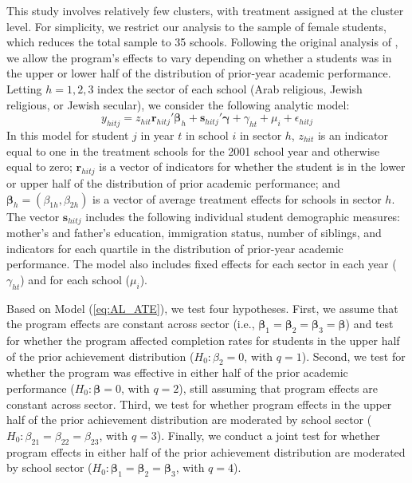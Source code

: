 \documentclass[12pt]{article}\usepackage[]{graphicx}\usepackage[]{color}
\newcommand{\bm}{\mathbf}
\newcommand{\bs}{\boldsymbol}
\begin{document}
This study involves relatively few clusters, with treatment assigned at the cluster level.
For simplicity, we restrict our analysis to the sample of female students, which reduces the total sample to 35 schools.
Following the original analysis of \citet{Angrist2009effects}, we allow the program's effects to vary depending on whether a students was in the upper or lower half of the distribution of prior-year academic performance. 
Letting $h = 1,2,3$ index the sector of each school (Arab religious, Jewish religious, or Jewish secular), we consider the following analytic model: 
\begin{equation}
\label{eq:AL_ATE}
y_{hitj} = z_{hit}\bm{r}_{hitj}'\bs\beta_h + \bm{s}_{hitj}'\bs\gamma + \gamma_{ht} + \mu_{i} + \epsilon_{hitj}
\end{equation}
In this model for student $j$ in year $t$ in school $i$ in sector $h$, $z_{hit}$ is an indicator equal to one in the treatment schools for the 2001 school year and otherwise equal to zero; $\bm{r}_{hitj}$ is a vector of indicators for whether the student is in the lower or upper half of the distribution of prior academic performance; and $\bs\beta_h = \left(\beta_{1h}, \beta_{2h}\right)$ is a vector of average treatment effects for schools in sector $h$. 
The vector $\bm{s}_{hitj}$ includes the following individual student demographic measures: mother's and father's education, immigration status, number of siblings, and indicators for each quartile in the distribution of prior-year academic performance. 
The model also includes fixed effects for each sector in each year ($\gamma_{ht}$) and for each school ($\mu_{i}$). 

Based on Model (\ref{eq:AL_ATE}), we test four hypotheses.
First, we assume that the program effects are constant across sector (i.e., $\bs\beta_1 = \bs\beta_2 = \bs\beta_3 = \bs\beta$) and test for whether the program affected completion rates for students in the upper half of the prior achievement distribution ($H_0: \beta_2 = 0$, with $q = 1$).
Second, we test for whether the program was effective in either half of the prior academic performance ($H_0: \bs\beta = 0$, with $q = 2$), still assuming that program effects are constant across sector. 
Third, we test for whether program effects in the upper half of the prior achievement distribution are moderated by school sector ($H_0: \beta_{21} = \beta_{22} = \beta_{23}$, with $q = 3$). 
Finally, we conduct a joint test for whether program effects in either half of the prior achievement distribution are moderated by school sector ($H_0: \bs\beta_1 = \bs\beta_2 = \bs\beta_3$, with $q = 4$). 
\end{document}
